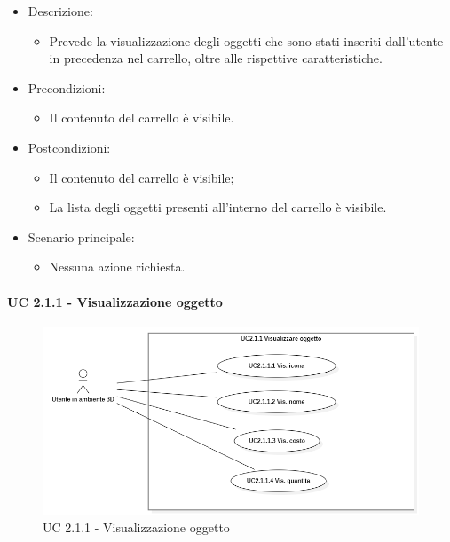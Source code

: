 \begin{itemize}
	
	\item Descrizione:
	\begin{itemize}
		\item Prevede la visualizzazione degli oggetti che sono stati inseriti dall'utente in precedenza nel carrello, oltre alle rispettive caratteristiche.
	\end{itemize}
	
	\item Precondizioni:
	\begin{itemize}
		\item Il contenuto del carrello è visibile.
	\end{itemize}
	
	\item Postcondizioni:
	\begin{itemize}
		\item Il contenuto del carrello è visibile;
		\item La lista degli oggetti presenti all'interno del carrello è visibile.
	\end{itemize}
	
	\item Scenario principale:
	\begin{itemize}
		\item Nessuna azione richiesta.
	\end{itemize}
	
\end{itemize}

\paragraph{UC 2.1.1 - Visualizzazione oggetto}

\begin{figure}[H]
  \renewcommand{\thefigure}{4}
  \includegraphics[width=\linewidth]{./res/images/UC2.1.1.png}
  \caption{UC 2.1.1 - Visualizzazione oggetto}
  \label{fig:UC 2.1.1}
\end{figure}

